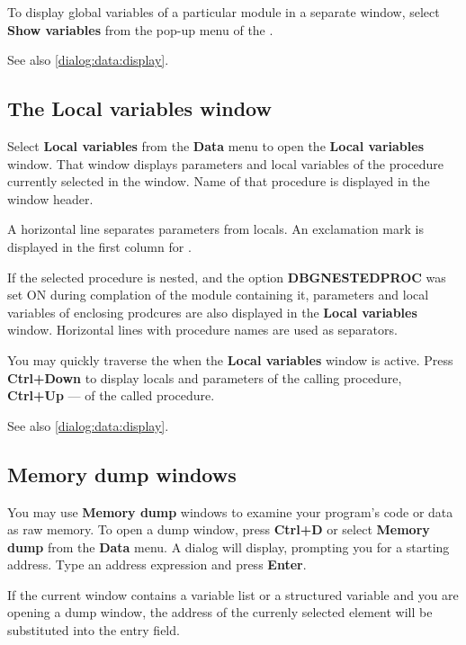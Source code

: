 To display global variables of a particular module in a separate window,
select {\bf Show variables} from the pop-up menu of the 
.

See also \ref{dialog:data:display}.

\subsection{The Local variables window}
\label{dialog:data:locals}

Select {\bf Local variables} from the {\bf Data} menu to open the
{\bf Local variables} window. That window displays parameters and local
variables of the procedure currently selected in the
 window.
Name of that procedure is displayed in the window header.

A horizontal line separates parameters from locals. An exclamation mark
is displayed in the first column for
.

If the selected procedure is nested, and the option {\bf DBGNESTEDPROC}
was set ON during complation of the module containing it, parameters and
local variables of enclosing prodcures are also displayed in the
{\bf Local variables} window. Horizontal lines with procedure names
are used as separators.

You may quickly traverse the 
when the {\bf Local variables} window is active. Press {\bf Ctrl+Down}
to display locals and parameters of the calling procedure, {\bf Ctrl+Up} ---
of the called procedure.

See also \ref{dialog:data:display}.

\subsection{Memory dump windows}
\label{dialog:data:dump}

You may use {\bf Memory dump} windows to examine your program's
code or data as raw memory. To open a dump window, press
{\bf Ctrl+D} or select {\bf Memory dump} from the {\bf Data} menu.
A dialog will display, prompting you for a starting address.
Type an address expression and press {\bf Enter}. %

If the current window contains a variable list or a structured variable
and you are opening a dump window, the address of the currenly selected
element will be substituted into the entry field.

